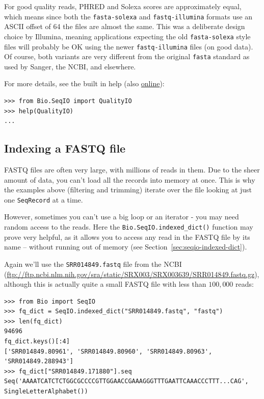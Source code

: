 \documentclass{report}
\begin{document}
For good quality reads, PHRED and Solexa scores are approximately equal,
which means since both the \texttt{fasta-solexa} and \texttt{fastq-illumina}
formats use an ASCII offset of 64 the files are almost the same. This was a
deliberate design choice by Illumina, meaning applications expecting the old
\texttt{fasta-solexa} style files will probably be OK using the newer
\texttt{fastq-illumina} files (on good data). Of course, both variants are
very different from the original \texttt{fasta} standard as used by Sanger,
the NCBI, and elsewhere.

For more details, see the built in help (also \href{http://www.biopython.org/DIST/docs/api/Bio.SeqIO.QualityIO-module.html}{online}):

\begin{verbatim}
>>> from Bio.SeqIO import QualityIO
>>> help(QualityIO)
...
\end{verbatim}

\subsection{Indexing a FASTQ file}
\label{sec:fastq-indexing}

FASTQ files are often very large, with millions of reads in them. Due to the
sheer amount of data, you can't load all the records into memory at once.
This is why the examples above (filtering and trimming) iterate over the file
looking at just one \verb|SeqRecord| at a time.

However, sometimes you can't use a big loop or an iterator - you may need
random access to the reads. Here the \verb|Bio.SeqIO.indexed_dict()| function
may prove very helpful, as it allows you to access any read in the FASTQ file
by its name -- without running out of memory (see
Section~\ref{sec:seqio-indexed-dict}).

Again we'll use the \texttt{SRR014849.fastq} file from the NCBI
(\url{ftp://ftp.ncbi.nlm.nih.gov/sra/static/SRX003/SRX003639/SRR014849.fastq.gz}),
although this is actually quite a small FASTQ file with less than $100,000$ reads:

\begin{verbatim}
>>> from Bio import SeqIO
>>> fq_dict = SeqIO.indexed_dict("SRR014849.fastq", "fastq")
>>> len(fq_dict)
94696
fq_dict.keys()[:4]
['SRR014849.80961', 'SRR014849.80960', 'SRR014849.80963', 'SRR014849.288943']
>>> fq_dict["SRR014849.171880"].seq
Seq('AAAATCATCTCTGGCGCCCCGTTGGAACCGAAAGGGTTTGAATTCAAACCCTTT...CAG', SingleLetterAlphabet())
\end{verbatim}
\end{document}
